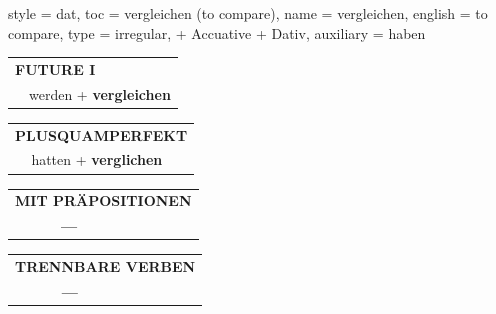 \begin{verbentry}{
  style = {dat},
  toc = {vergleichen (to compare)},
  name = {vergleichen},
  english = {to compare},
  type = {irregular, + Accuative + Dativ},
  auxiliary = {haben}
}
\begin{tabular}{rl}
    \multicolumn{2}{l}{\textbf{FUTURE I} }\\
  &  werden + \textbf{vergleichen}\\
 
  \end{tabular}
\hfill
   \begin{tabular}{rl}
      \multicolumn{2}{l}{\textbf{PLUSQUAMPERFEKT}}\\
  &  hatten + \textbf{verglichen}\\
  \end{tabular}
  
  
\vspace{10pt}

\begin{tabular}{lll}
\multicolumn{3}{l}{\textbf{MIT PRÄPOSITIONEN}}\\
& \textbf{---} & \\
\end{tabular}
\hfill
\begin{tabular}{lll}
\multicolumn{3}{l}{\textbf{TRENNBARE VERBEN}}\\
& \textbf{---} & \\
\end{tabular}
\vspace{-5pt}
\end{verbentry}

